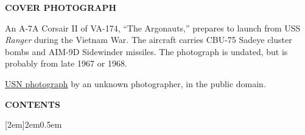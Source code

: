 \begin{center}
\textbf{COVER PHOTOGRAPH}
\end{center}

An A-7A Corsair II of VA-174, “The Argonauts,” prepares to launch from USS \textit{Ranger} during the Vietnam War. The aircraft carries CBU-75 Sadeye cluster bombs and AIM-9D Sidewinder missiles. The photograph is undated, but is probably from late 1967 or 1968. 

\href{https://www.history.navy.mil/our-collections/photography/numerical-list-of-images/nhhc-series/naval-subjects-collection/l01--aviation/l01-18-04-01-a-7-corsair-ii.html}{USN photograph} by an unknown photographer, in the public domain.

\newpage

\setcounter{tocdepth}{1}
\begin{center}
\textbf{CONTENTS}
\end{center}
\contentsmargin{2em}
[2em]{}{2em}{0.5em}
\renewcommand\contentsname{}
\begingroup
\let\clearpage\relax
\vspace{-7ex}
\tableofcontents
\endgroup
